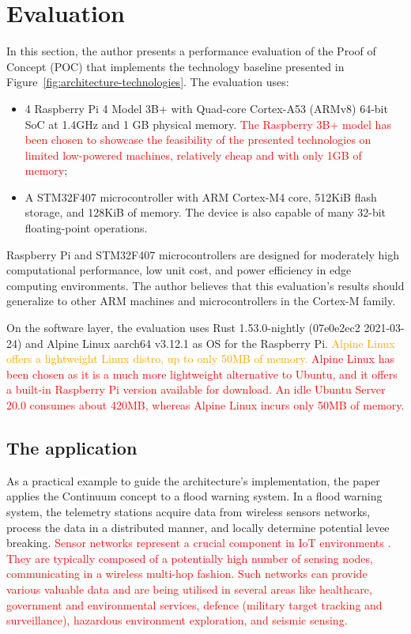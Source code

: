 \section{Evaluation}
\label{sec:evaluation}

In this section, the author presents a performance evaluation of the Proof of Concept (POC) that implements the technology baseline presented in Figure~\ref{fig:architecture-technologies}. The evaluation uses:

\begin{itemize}
    \item 4 Raspberry Pi 4 Model 3B+ with Quad-core Cortex-A53 (ARMv8) 64-bit SoC at 1.4GHz and 1 GB physical memory. \textcolor{red}{The Raspberry 3B+ model has been chosen to showcase the feasibility of the presented technologies on limited low-powered machines, relatively cheap and with only 1GB of memory};
    \item A STM32F407 microcontroller with ARM Cortex-M4 core, 512KiB flash storage, and 128KiB of memory. The device is also capable of many 32-bit floating-point operations.
\end{itemize}

Raspberry Pi and STM32F407 microcontrollers are designed for moderately high computational performance, low unit cost, and power efficiency in edge computing environments. The author believes that this evaluation's results should generalize to other ARM machines and microcontrollers in the Cortex-M family.

On the software layer, the evaluation uses Rust 1.53.0-nightly (07e0e2ec2 2021-03-24) and Alpine Linux aarch64 v3.12.1 as OS for the Raspberry Pi. 
\textcolor{orange}{Alpine Linux offers a lightweight Linux distro, up to only 50MB of memory.}
\textcolor{red}{Alpine Linux has been chosen as it is a much more lightweight alternative to Ubuntu, and it offers a built-in Raspberry Pi version available for download. An idle Ubuntu Server 20.0 consumes about 420MB, whereas Alpine Linux incurs only 50MB of memory.}

\subsection{The application}

As a practical example to guide the architecture's implementation, the paper applies the Continuum concept to a flood warning system. In a flood warning system, the telemetry stations acquire data from wireless sensors networks, process the data in a distributed manner, and locally determine potential levee breaking. \textcolor{red}{Sensor networks represent a crucial component in IoT environments \cite{yu2017survey}. They are typically composed of a potentially high number of sensing nodes, communicating in a wireless multi-hop fashion. Such networks can provide various valuable data and are being utilised in several areas like healthcare, government and environmental services, defence (military target tracking and surveillance), hazardous environment exploration, and seismic sensing.}


